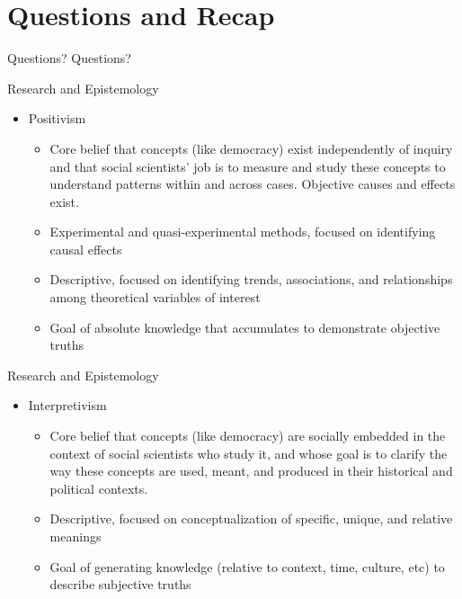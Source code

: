 \documentclass{beamer}
\begin{document}
\section{Questions and Recap} 
\begin{frame}{Questions?}
Questions? 
\end{frame} 

\begin{frame}{Research and Epistemology}
\begin{itemize}
    \item Positivism  
    \begin{itemize}
        \item Core belief that concepts (like democracy) exist independently of inquiry and that social scientists' job is to measure and study these concepts to understand patterns within and across cases. Objective causes and effects exist. 
        \item Experimental and quasi-experimental methods,  focused on identifying causal effects 
        \item Descriptive, focused on identifying trends, associations, and relationships among theoretical variables of interest 
        \item Goal of absolute knowledge that accumulates to demonstrate objective truths  
    \end{itemize} 
    \end{itemize}
\end{frame}
\begin{frame}{Research and Epistemology}
\begin{itemize}
    \item Interpretivism  
    \begin{itemize}
        \item Core belief that concepts (like democracy) are socially embedded in the context of social scientists who study it, and whose goal is to clarify the way these concepts are used, meant, and produced in their historical and political contexts.  
        \item Descriptive, focused on conceptualization of specific, unique, and relative meanings 
        \item Goal of generating knowledge (relative to context, time, culture, etc) to describe subjective truths  
    \end{itemize}
\end{itemize}
\end{frame} 
\end{document}
